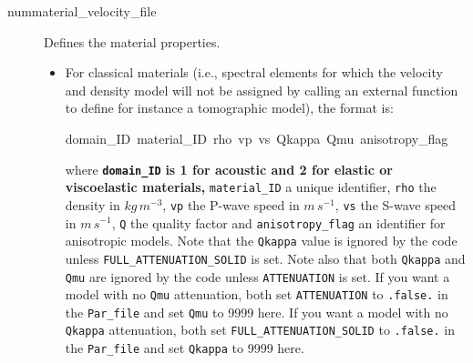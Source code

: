 \begin{description}
\item [{nummaterial\_velocity\_file}] Defines the material properties.

\begin{itemize}
\item For classical materials (i.e., spectral elements for which the velocity
and density model will not be assigned by calling an external function
to define for instance a tomographic model), the format is:

\begin{lyxcode}
domain\_ID~material\_ID~rho~vp~vs~Qkappa~Qmu~anisotropy\_flag
\end{lyxcode}

where \texttt{\textbf{domain\_ID}}\textbf{ is 1 for acoustic and 2
for elastic or viscoelastic materials,} \texttt{material\_ID} a unique
identifier, \texttt{rho} the density in $kg\, m^{-3}$, \texttt{vp}
the P-wave speed in $m\, s^{-1}$, \texttt{vs} the S-wave speed in
$m\, s^{-1}$, \texttt{Q} the quality factor and \texttt{anisotropy\_flag}
an identifier for anisotropic models. Note that the \texttt{Qkappa}
value is ignored by the code unless \texttt{FULL\_ATTENUATION\_SOLID}
is set. Note also that both \texttt{Qkappa} and \texttt{Qmu} are ignored
by the code unless \texttt{ATTENUATION} is set. If you want a model
with no \texttt{Qmu} attenuation, both set \texttt{ATTENUATION} to
\texttt{.false.} in the \texttt{Par\_file} and set \texttt{Qmu} to
9999 here. If you want a model with no \texttt{Qkappa} attenuation,
both set \texttt{FULL\_ATTENUATION\_SOLID} to \texttt{.false.} in
the \texttt{Par\_file} and set \texttt{Qkappa} to 9999 here. %



\end{itemize}
\end{description}
